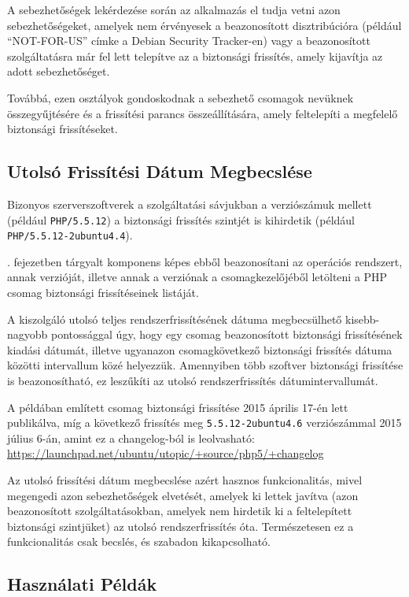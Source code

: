 \documentclass[a4paper,12pt]{article}
\begin{document}
	A sebezhetőségek lekérdezése során az alkalmazás el tudja vetni azon sebezhetőségeket, amelyek nem érvényesek a beazonosított disztribúcióra (például ``NOT-FOR-US'' címke a Debian Security Tracker-en) vagy a beazonosított szolgáltatásra már fel lett telepítve az a biztonsági frissítés, amely kijavítja az adott sebezhetőséget.
	
	Továbbá, ezen osztályok gondoskodnak a sebezhető csomagok nevüknek összegyűjtésére és a frissítési parancs összeállítására, amely feltelepíti a megfelelő biztonsági frissítéseket.

\subsection{Utolsó Frissítési Dátum Megbecslése}

	Bizonyos szerverszoftverek a szolgáltatási sávjukban a verziószámuk mellett (például \texttt{PHP/5.5.12}) a biztonsági frissítés szintjét is kihirdetik (például \texttt{PHP/5.5.12-2ubuntu4.4}).
	
	\Az{\ref{ssec:opsysmatcher}}. fejezetben tárgyalt komponens képes ebből beazonosítani az operációs rendszert, annak verzióját, illetve annak a verziónak a csomagkezelőjéből letölteni a PHP csomag biztonsági frissítéseinek listáját.
	
	A kiszolgáló utolsó teljes rendszerfrissítésének dátuma megbecsülhető kisebb-nagyobb pontossággal úgy, hogy egy csomag beazonosított biztonsági frissítésének kiadási dátumát, illetve ugyanazon csomagkövetkező biztonsági frissítés dátuma közötti intervallum közé helyezzük. Amennyiben több szoftver biztonsági frissítése is beazonosítható, ez leszűkíti az utolsó rendszerfrissítés dátumintervallumát.
	
	A példában említett csomag biztonsági frissítése 2015 április 17-én lett publikálva, míg a következő frissítés meg \texttt{5.5.12-2ubuntu4.6} verziószámmal 2015 július 6-án, amint ez a changelog-ból is leolvasható: \url{https://launchpad.net/ubuntu/utopic/+source/php5/+changelog}
	
	Az utolsó frissítési dátum megbecslése azért hasznos funkcionalitás, mivel megengedi azon sebezhetőségek elvetését, amelyek ki lettek javítva (azon beazonosított szolgáltatásokban, amelyek nem hirdetik ki a feltelepített biztonsági szintjüket) az utolsó rendszerfrissítés óta. Természetesen ez a funkcionalitás csak becslés, és szabadon kikapcsolható.

\subsection{Használati Példák}
\end{document}
